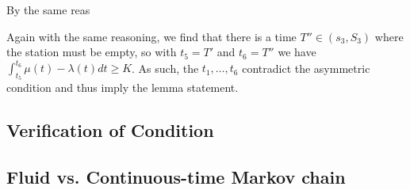 By the same reas


Again with the same reasoning, we find that there is a time $T''\in(s_3,S_3)$ where the station must be empty, so with $t_5=T'$ and $t_6=T''$ we have $\int_{t_5}^{t_6} \mu(t)-\lambda(t)dt\geq K$. As such, the $t_1,\ldots,t_6$ contradict the asymmetric condition and thus imply the lemma statement.

 


\subsection{Verification of Condition}

\subsection{Fluid vs. Continuous-time Markov chain}
